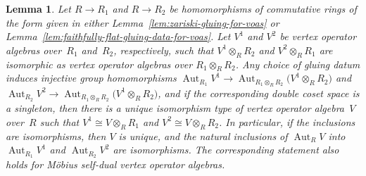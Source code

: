 \documentclass[11pt]{article}
\DeclareMathOperator{\Aut}{Aut}
\newtheorem{lem}[thm]{Lemma}
\theoremstyle{definition}
\begin{document}
\begin{lem} \label{lem:unique-voa-from-descent}Let $R \to R_1$ and $R \to R_2$ be homomorphisms of commutative rings of the form given in either Lemma~{\rm \ref{lem:zariski-gluing-for-voas}} or Lemma~{\rm \ref{lem:faithfully-flat-gluing-data-for-voas}}. Let $V^1$ and $V^2$ be vertex operator algebras over~$R_1$ and~$R_2$, respectively, such that $V^1 \otimes_{R} R_2$ and $V^2 \otimes_{R} R_1$ are isomorphic as vertex operator algebras over $R_1 \otimes_{R} R_2$. Any choice of gluing datum induces injective group homomorphisms $\Aut_{R_1} V^1 \to \Aut_{R_1 \otimes_{R} R_2} \big(V^1 \otimes_{R} R_2\big)$ and $\Aut_{R_2} V^2 \to \Aut_{R_1 \otimes_{R} R_2} \big(V^1 \otimes_{R} R_2\big)$, and if the corresponding double coset space is a singleton, then there is a unique isomorphism type of vertex operator algebra~$V$ over~$R$ such that $V^1 \cong V \otimes_{R} R_1$ and $V^2 \cong V \otimes_{R} R_2$. In particular, if the inclusions are isomorphisms, then $V$ is unique, and the natural inclusions of $\Aut_R V$ into $\Aut_{R_1} V^1$ and $\Aut_{R_2} V^2$ are isomorphisms. The corresponding statement also holds for M\"obius self-dual vertex operator algebras.
\end{lem}
\end{document}
